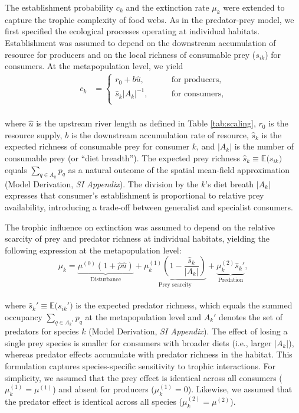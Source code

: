 \documentclass[9pt,twocolumn,twoside]{pnas-new}
\begin{document}
The establishment probability $c_k$ and the extinction rate $\mu_k$ were extended to capture the trophic complexity of food webs.
As in the predator-prey model, we first specified the ecological processes operating at individual habitats.
Establishment was assumed to depend on the downstream accumulation of resource for producers and on the local richness of consumable prey ($s_{ik}$) for consumers.
At the metapopulation level, we yield
\\
\begin{align}
    c_k 
    &=
    \begin{cases}
        r_0 + b \hat{u}, \qquad &\text{for producers},\\
        \hat{s}_k |A_k|^{-1}, \qquad &\text{for consumers},\\
    \end{cases}
    \label{eq:estb-prob}
\end{align}
\\
where $\hat{u}$ is the upstream river length as defined in Table \ref{tab:scaling}, $r_0$ is the resource supply, $b$ is the downstream accumulation rate of resource, $\hat{s}_k$ is the expected richness of consumable prey for consumer $k$, and $|A_k|$ is the number of consumable prey (or ``diet breadth'').
The expected prey richness $\hat{s}_k \equiv \mathbb{E}\bigl(s_{ik}\bigr)$ equals $\sum_{q \in A_k} p_q$ as a natural outcome of the spatial mean-field approximation (Model Derivation, \textit{SI Appendix}).
The division by the $k$'s diet breath $|A_k|$ expresses that consumer's establishment is proportional to relative prey availability, introducing a trade-off between generalist and specialist consumers.

The trophic influence on extinction was assumed to depend on the relative scarcity of prey and predator richness at individual habitats, yielding the following expression at the metapopulation level:
\\
\begin{equation}
    \mu_{k} = 
        \underbrace{\mu^{(0)} (1 + \hat{\rho} \hat{u})}_{\text{Disturbance}} + 
        \underbrace{\mu_k^{(1)} \left(1 - \frac{\hat{s}_k}{|A_{k}|}\right)}_{\text{Prey scarcity}} +
        \underbrace{\mu_k^{(2)} \hat{s}_k'}_{\text{Predation}},
    \label{eq:extn-main}    
\end{equation}
\\
where $\hat{s}_k' \equiv \mathbb{E}\bigl(s_{ik}'\bigr)$ is the expected predator richness, which equals the summed occupancy $\sum_{q \in A_k'} p_q$ at the metapopulation level and $A_k'$ denotes the set of predators for species $k$ (Model Derivation, \textit{SI Appendix}).
The effect of losing a single prey species is smaller for consumers with broader diets (i.e., larger $|A_k|$), whereas predator effects accumulate with predator richness in the habitat.
This formulation captures species-specific sensitivity to trophic interactions.
For simplicity, we assumed that the prey effect is identical across all consumers ($\mu_k^{(1)} = \mu^{(1)}$) and absent for producers ($\mu_k^{(1)} = 0$).
Likewise, we assumed that the predator effect is identical across all species ($\mu_k^{(2)} = \mu^{(2)}$).
\end{document}
